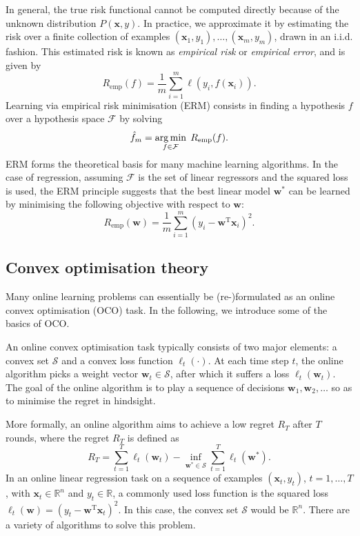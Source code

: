 In general, the true risk functional cannot be computed directly because of the unknown distribution $P(\mathbf{x}, y)$. In practice, we approximate it by estimating the risk over a finite collection of examples $(\mathbf{x}_1, y_1), \ldots, (\mathbf{x}_m, y_m)$, drawn in an i.i.d. fashion. This estimated risk is known as \emph{empirical risk} or \emph{empirical error}, and is given by
\begin{equation}
	R_\text{emp}(f) = \frac{1}{m} \sum_{i=1}^m \ell(y_i, f(\mathbf{x}_i)).
\end{equation}
Learning via empirical risk minimisation (ERM) consists in finding a hypothesis $f$ over a hypothesis space $\mathcal{F}$ by solving
\begin{equation}
	\hat{f}_m = \operatorname*{arg\,min}_{f\in\mathcal{F}} \; R_\text{emp}(f).
\end{equation}
ERM forms the theoretical basis for many machine learning algorithms. In the case of regression, assuming $\mathcal{F}$ is the set of linear regressors and the squared loss is used, the ERM principle suggests that the best linear model $\mathbf{w}^*$ can be learned by minimising the following objective with respect to $\mathbf{w}$:
\begin{equation}
	R_\text{emp}(\mathbf{w}) =  \frac{1}{m} \sum_{i=1}^m (y_i - \mathbf{w}^\text{T}\mathbf{x}_i)^2.
\end{equation}

\subsection{Convex optimisation theory}

Many online learning problems can essentially be (re-)formulated as an online convex optimisation (OCO) task. In the following, we introduce some of the basics of OCO.

An online convex optimisation task typically consists of two major elements: a convex set $\mathcal{S}$ and a convex loss function $\ell_t(\cdot)$. At each time step $t$, the online algorithm picks a weight vector $\mathbf{w}_t \in \mathcal{S}$, after which it suffers a loss $\ell_t(\mathbf{w}_t)$. The goal of the online algorithm is to play a sequence of decisions $\mathbf{w}_1, \mathbf{w}_2, \ldots$ so as to minimise the regret in hindsight.

More formally, an online algorithm aims to achieve a low regret $R_T$ after $T$ rounds, where the regret $R_T$ is defined as
\begin{equation}
\label{eq:regret}
	R_T = \sum_{t=1}^T \ell_t(\mathbf{w}_t) - \inf_{\mathbf{w}^* \in \mathcal{S}} \sum_{t=1}^T \ell_t(\mathbf{w}^*).
\end{equation}
In an online linear regression task on a sequence of examples $(\mathbf{x}_t, y_t)$, $t=1,\ldots,T$, with $\mathbf{x}_t \in \mathbb{R}^n$ and $y_t \in \mathbb{R}$, a commonly used loss function is the squared loss $\ell_t(\mathbf{w}) = (y_t - \mathbf{w}^\text{T}\mathbf{x}_t)^2$. In this case, the convex set $\mathcal{S}$ would be $\mathbb{R}^n$. There are a variety of algorithms to solve this problem.

